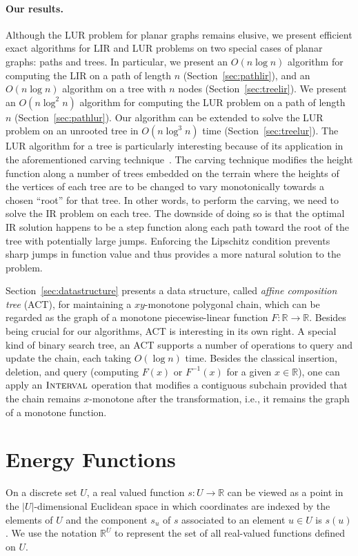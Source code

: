 \documentclass[11pt]{article}
\def\reals{\mathbb{R}}
\def\itrans{\mathop{\textsc{Interval}}}
\begin{document}
\paragraph{Our results.} 
Although the LUR problem for planar graphs remains elusive, we present
efficient exact algorithms for LIR and LUR problems on two special cases of 
planar graphs: paths and trees.  
In particular, we present an $O(n \log n)$ algorithm for computing the LIR on a path of length $n$ (Section~\ref{sec:pathlir}), and an $O(n \log n)$ algorithm on a tree with $n$ nodes (Section~\ref{sec:treelir}). 
We present an $O(n\log^2 n)$ algorithm for computing the
LUR problem on a path of length $n$ (Section~\ref{sec:pathlur}). 
Our algorithm can be extended to solve the LUR problem on an unrooted tree in $O(n \log^3 n)$ time (Section~\ref{sec:treelur}). 
The LUR algorithm for a tree is particularly interesting because of 
its application in the aforementioned carving 
technique~\cite{Danner:07,Soille:04,Soille:03a}. 
The carving technique modifies the height function along a number 
of trees embedded on the terrain where the heights of the vertices 
of each tree are to be changed to vary monotonically towards 
a chosen ``root'' for that tree. In other words, to perform the 
carving, we need to solve the IR problem on each tree. The downside of 
doing so is that the optimal IR solution happens to be a step function 
along each path toward the root of the tree with potentially large 
jumps. Enforcing the Lipschitz condition prevents sharp jumps 
in function value and thus provides a more natural solution 
to the problem.

Section~\ref{sec:datastructure} presents a data structure, called {\em affine composition tree} (ACT), for maintaining a $xy$-monotone polygonal chain, which can be regarded as the graph of a monotone piecewise-linear function $F: \reals \rightarrow \reals$.  
Besides being crucial for our algorithms, ACT is interesting in its own right.
A special kind of binary search tree, an ACT supports a number of operations to query and update the chain, each taking $O(\log n)$ time.
Besides the classical insertion, deletion, and query (computing $F(x)$ or $F^{-1}(x)$ for a given $x \in \reals$),  one can apply an $\itrans$ operation that modifies a contiguous subchain provided that the chain  remains $x$-monotone after the transformation, i.e., it remains the graph of a monotone function.  




\section{Energy Functions}
On a discrete set $U$, a real valued function $s: U \rightarrow \mathbb{R}$ can be viewed as a point in the $|U|$-dimensional Euclidean space in which coordinates are indexed by the elements of $U$ and the component $s_u$ of $s$ associated to an element $u \in U$ is $s(u)$. We use the notation $\mathbb{R}^U$ to represent the set of all real-valued functions defined on $U$. 
\end{document}
